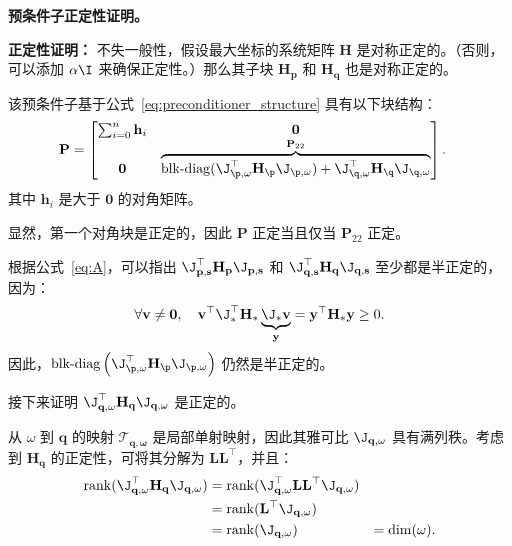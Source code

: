 \noindent\textbf{预条件子正定性证明。}\label{app:invertible}

\textbf{正定性证明：} 不失一般性，假设最大坐标的系统矩阵 $\mathbf{H}$ 是对称正定的。（否则，可以添加 $\alpha \I$ 来确保正定性。）那么其子块 $\mathbf{H}_{\mathbf{p}}$ 和 $\mathbf{H}_{\mathbf{q}}$ 也是对称正定的。

该预条件子基于公式~\ref{eq:preconditioner_structure} 具有以下块结构：
\begin{equation}
  \begin{aligned}
    \mathbf{P} & =\begin{bmatrix}
                    \sum_{i=0}^{n}\mathbf{h}_{i} & \mathbf{0}                                                                                                                                                \\
                    \mathbf{0}                   & \overbrace{\operatorname{blk-diag}(\J_{\p,\omega}^\top \mathbf{H}_\p \J_{\p,\omega})+ \J_{\q,\omega}^\top \mathbf{H}_\q \J_{\q,\omega}}^{\mathbf{P}_{22}}
                  \end{bmatrix}.
  \end{aligned}
\end{equation}
其中 $\mathbf{h}_{i}$ 是大于 $\mathbf{0}$ 的对角矩阵。

显然，第一个对角块是正定的，因此 $\mathbf{P}$ 正定当且仅当 $\mathbf{P}_{22}$ 正定。

根据公式~\ref{eq:A}，可以指出 $\J_{\mathbf{p, s}}^{\top}\mathbf{H}_{\mathbf{p}}\J_{\mathbf{p, s}}$ 和 $\J_{\mathbf{q, s}}^{\top}\mathbf{H}_{\mathbf{q}}\J_{\mathbf{q, s}}$ 至少都是半正定的，因为：
\begin{equation}
  \forall \mathbf{v} \ne \mathbf{0}, \quad
  \mathbf{v}^{\top}\J_{*}^{\top}\mathbf{H}_{*}\underbrace{\J_{*} \mathbf{v}}_{\mathbf{y}} = \mathbf{y}^{\top}
  \mathbf{H}_{*}\mathbf{y} \geq 0.
\end{equation}
因此，$\operatorname{blk-diag}\left(\J_{\p, \omega}^\top \mathbf{H}_{\p} \J_{\p,
    \omega}\right)$ 仍然是半正定的。

接下来证明 $\J_{\mathbf{q,\omega}}^{\top}\mathbf{H}_{\mathbf{q}}\J_{\mathbf{q,\omega}}$ 是正定的。

从 $\omega$ 到 $\mathbf{q}$ 的映射 $\mathcal{T}_{\mathbf{q,\omega}}$ 是局部单射映射，因此其雅可比 $\J_{\mathbf{q,\omega}}$ 具有满列秩。考虑到 $\mathbf{H_{\mathbf q}}$ 的正定性，可将其分解为 $\mathbf{LL}^{\top}$，并且：
\begin{equation}
  \begin{aligned}
    \mathrm{rank}(\J_{\mathbf{q,\omega}}^{\top}\mathbf{H}_{\mathbf{q}}\J_{\mathbf{q,\omega}})
     & =
    \mathrm{rank}(\J_{\mathbf{q,\omega}}^{\top}\mathbf{LL}^{\top}\J_{\mathbf{q,\omega}}) \\
     & =\mathrm{rank}(\mathbf{L}^{\top}\J_{\mathbf{q,\omega}})                           \\
     & =\mathrm{rank}(\J_{\mathbf{q,\omega}})
     & =\mathrm{dim}(\omega).
  \end{aligned}
\end{equation}

